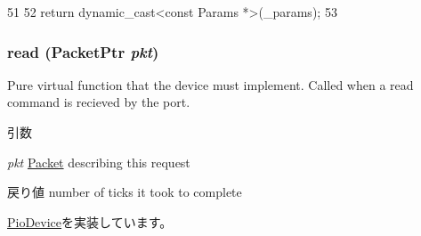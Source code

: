 \begin{DoxyCode}
51     {
52         return dynamic_cast<const Params *>(_params);
53     }
\end{DoxyCode}
\hypertarget{classX86ISA_1_1I8237_a613ec7d5e1ec64f8d21fec78ae8e568e}{
\subsubsection[{read}]{ read ({\bf PacketPtr} {\em pkt})}}
\label{classX86ISA_1_1I8237_a613ec7d5e1ec64f8d21fec78ae8e568e}
Pure virtual function that the device must implement. Called when a read command is recieved by the port. 
\begin{DoxyParams}{引数}
\item[{\em pkt}]\hyperlink{classPacket}{Packet} describing this request \end{DoxyParams}
\begin{DoxyReturn}{戻り値}
number of ticks it took to complete 
\end{DoxyReturn}


\hyperlink{classPioDevice_a842312590432036092c422c87a442358}{PioDevice}を実装しています。


